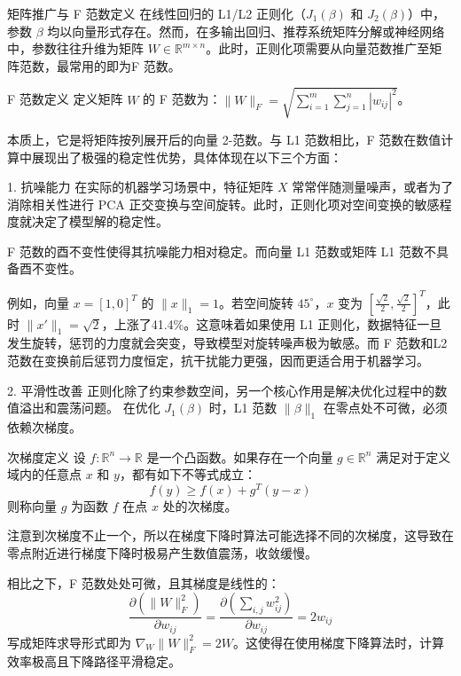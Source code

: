 \documentclass[aspectratio=169]{beamer}
\begin{document}
\begin{frame}{矩阵推广与 F 范数定义}
    在线性回归的 L1/L2 正则化（$J_1(\beta)$ 和 $J_2(\beta)$）中，参数 $\beta$ 均以向量形式存在。然而，在多输出回归、推荐系统矩阵分解或神经网络中，参数往往升维为矩阵 $W \in \mathbb{R}^{m \times n}$。此时，正则化项需要从向量范数推广至矩阵范数，最常用的即为F 范数。
    
    \begin{block}{F 范数定义}
        定义矩阵 $W$ 的 F 范数为：$\|W\|_F = \sqrt{\sum_{i=1}^m \sum_{j=1}^n |w_{ij}|^2}$。
    \end{block}
    
    本质上，它是将矩阵按列展开后的向量 2-范数。与 L1 范数相比，F 范数在数值计算中展现出了极强的稳定性优势，具体体现在以下三个方面：
\end{frame}

\begin{frame}{1. 抗噪能力}
    在实际的机器学习场景中，特征矩阵 $X$ 常常伴随测量噪声，或者为了消除相关性进行 PCA 正交变换与空间旋转。此时，正则化项对空间变换的敏感程度就决定了模型解的稳定性。
    
    F 范数的酉不变性使得其抗噪能力相对稳定。而向量 L1 范数或矩阵 L1 范数不具备酉不变性。
    
    例如，向量 $x = [1, 0]^T$ 的 $\|x\|_1 = 1$。若空间旋转 $45^\circ$，$x$ 变为 $[\frac{\sqrt{2}}{2}, \frac{\sqrt{2}}{2}]^T$，此时 $\|x'\|_1 = \sqrt{2}$，上涨了41.4\%。这意味着如果使用 L1 正则化，数据特征一旦发生旋转，惩罚的力度就会突变，导致模型对旋转噪声极为敏感。而 F 范数和L2 范数在变换前后惩罚力度恒定，抗干扰能力更强，因而更适合用于机器学习。
\end{frame}

\begin{frame}{2. 平滑性改善}
    正则化除了约束参数空间，另一个核心作用是解决优化过程中的数值溢出和震荡问题。
    在优化 $J_1(\beta)$ 时，L1 范数 $\| \beta \|_1$ 在零点处不可微，必须依赖次梯度。
    
    \begin{block}{次梯度定义}
        设 $f: \mathbb{R}^n \to \mathbb{R}$ 是一个凸函数。如果存在一个向量 $g \in \mathbb{R}^n$ 满足对于定义域内的任意点 $x$ 和 $y$，都有如下不等式成立：
        $$f(y) \geq f(x) + g^T(y - x)$$
        则称向量 $g$ 为函数 $f$ 在点 $x$ 处的次梯度。
    \end{block}
    
    注意到次梯度不止一个，所以在梯度下降时算法可能选择不同的次梯度，这导致在零点附近进行梯度下降时极易产生数值震荡，收敛缓慢。
    
    相比之下，F 范数处处可微，且其梯度是线性的：
    $$ \frac{\partial (\|W\|_F^2)}{\partial w_{ij}} = \frac{\partial (\sum_{i,j} w_{ij}^2)}{\partial w_{ij}} = 2w_{ij} $$
    写成矩阵求导形式即为 $\nabla_W \|W\|_F^2 = 2W$。这使得在使用梯度下降算法时，计算效率极高且下降路径平滑稳定。
\end{frame}
\end{document}
